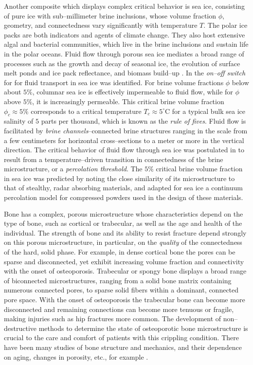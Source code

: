\documentclass[english,12pt]{ttuthes}
\begin{document}
Another composite which displays complex critical behavior is sea ice,
consisting of pure ice with sub--millimeter brine inclusions, whose
volume fraction $\phi$, geometry, and connectedness vary significantly
with temperature $T$. The polar ice packs are both indicators and
agents of climate change. They also host extensive algal and bacterial
communities, which live in the brine inclusions and sustain life in
the polar oceans. Fluid flow through porous sea ice mediates a broad
range of processes such as the growth and decay of seasonal ice, the
evolution of surface melt ponds and ice pack reflectance, and biomass
build--up \cite{Golden:NAMS:2009}. In \cite{Golden:S-2238} the
\emph{on--off switch} for for fluid transport in sea ice was
identified. For brine volume fractions $\phi$ below about $5\%$, columnar
sea ice is effectively impermeable to fluid flow, while for $\phi$ above
$5\%$, it is increasingly permeable. This critical brine volume fraction
$\phi_c\approx5\%$ corresponds to a critical temperature $T_c\approx5^{\circ}$C for a
typical bulk sea ice salinity of $5$ parts per thousand, which is
known as the \emph{rule of fives}. Fluid flow is facilitated by
\emph{brine channels}--connected brine structures ranging in the scale
from a few centimeters for horizontal cross--sections to a meter or
more in the vertical direction. The critical behavior of fluid flow
through sea ice was postulated in \cite{Golden:S-2238} to result from a
temperature--driven transition in connectedness of the brine
microstructure, or a \emph{percolation threshold}. The $5\%$ critical
brine volume fraction in sea ice was predicted by noting the close
similarity of its microstructure to that of stealthy, radar absorbing
materials, and adapted for sea ice a continuum percolation model for
compressed powders \cite{Kusy:JAP-5301,Kusy:N-58} used in the design
of these materials.

Bone has a complex, porous microstructure whose characteristics depend
on the type of bone, such as cortical or trabecular, as well as the
age and health of the individual. The strength of bone and its ability
to resist fracture depend strongly on this porous microstructure, in
particular, on the \emph{quality} of the connectedness of the hard,
solid phase. For example, in dense cortical bone the pores can be
sparse and disconnected, yet exhibit increasing volume fraction and
connectivity with the onset of osteoporosis. Trabecular or spongy bone
displays a broad range of biconnected microstructures, ranging from a
solid bone matrix containing numerous connected pores, to sparse solid
fibers within a dominant, connected pore space. With the onset of
osteoporosis the trabecular bone can become more disconnected and
remaining connections can become more tenuous or fragile, making
injuries such as hip fractures more common. The development of
non--destructive methods to determine the state of osteoporotic bone
microstructure is crucial to the care and comfort of patients with
this crippling condition. There have been many studies of bone
structure and mechanics, and their dependence on aging, changes in
porosity, etc., for example \cite{}.
\end{document}
